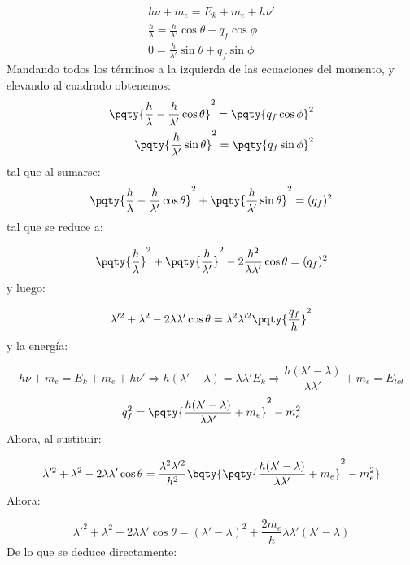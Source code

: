 \begin{eqnarray}
    h \nu + m_e = E_k + m_e + h \nu' \\
    \frac{h}{\lambda}= \frac{h}{\lambda'}\cos \theta + q_f \cos \phi  \\
    0 = \frac{h}{\lambda'} \sin \theta + q_f \sin \phi
\end{eqnarray}
Mandando todos los términos a la izquierda de las ecuaciones del momento, y elevando al cuadrado obtenemos: 
\begin{eqnarray}
    \pqty{\frac{h}{\lambda}- \frac{h}{\lambda'}\cos \theta}^2= \pqty{q_f \cos \phi}^2  \\
    \pqty{\frac{h}{\lambda'} \sin \theta}^2 = \pqty{q_f \sin \phi}^2
\end{eqnarray}
tal que al sumarse: 
\begin{equation}
    \pqty{\frac{h}{\lambda}- \frac{h}{\lambda'}\cos \theta}^2+ \pqty{\frac{h}{\lambda'} \sin \theta}^2 = (q_f)^2
\end{equation}
tal que se reduce a: 

\begin{equation}
    \pqty{\frac{h}{\lambda}}^2 + \pqty{\frac{h}{\lambda'}}^2 
    - 2 \frac{h^2}{\lambda \lambda'} \cos \theta = (q_f)^2
\end{equation}
y luego: 

\begin{equation}
    \lambda'^2 + \lambda^2 - 2 \lambda\lambda' \cos \theta = \lambda^2 \lambda'^2 \pqty{\frac{q_f}{h}}^2
\end{equation}
y la energía: 

\begin{equation}
    h \nu + m_e = E_k + m_e + h \nu' \Rightarrow  h(\lambda'-\lambda) =\lambda \lambda' E_k \Rightarrow \frac{h(\lambda'-\lambda)}{\lambda \lambda'} + m_e = E_{tot}
\end{equation}
\begin{equation}
    q_f^2 = \pqty{\frac{h(\lambda'-\lambda)}{\lambda \lambda'} + m_e }^2 - m_e^2 
\end{equation}
Ahora, al sustituir: 

\begin{equation}
    \lambda'^2 + \lambda^2 - 2 \lambda\lambda' \cos \theta = \frac{\lambda^2 \lambda'^2}{h^2} \bqty{\pqty{\frac{h(\lambda'-\lambda)}{\lambda \lambda'} + m_e }^2 - m_e^2 }
\end{equation}
Ahora: 

\begin{equation}
    \lambda'^2 + \lambda^2 - 2 \lambda \lambda' \cos \theta = (\lambda'- \lambda)^2 + \frac{2 m_e}{h}  \lambda \lambda' (\lambda'-\lambda)
\end{equation}
De lo que se deduce directamente: 

